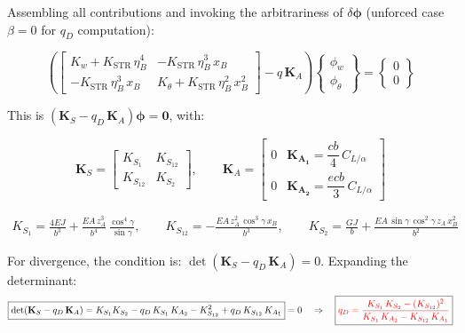Assembling all contributions and invoking the arbitrariness of $\delta\boldsymbol{\phi}$
(unforced case $\beta = 0$ for $q_D$ computation):

\begin{equation}
\boxed{
\left(
\begin{bmatrix}
K_w + K_{\mathrm{STR}}\,\eta_B^4 & -K_{\mathrm{STR}}\,\eta_B^3\,x_B \\
-K_{\mathrm{STR}}\,\eta_B^3\,x_B & K_\theta + K_{\mathrm{STR}}\,\eta_B^2\,x_B^2
\end{bmatrix}
- q\,\mathbf{K}_A
\right)
\begin{Bmatrix}\phi_w \\ \phi_\theta\end{Bmatrix}
=
\begin{Bmatrix}0\\0\end{Bmatrix}
}
\end{equation}

This is $\left(\mathbf{K}_S - q_D\,\mathbf{K}_A\right)\boldsymbol{\phi} = \mathbf{0}$, with:

\begin{equation}
\mathbf{K}_S =
\begin{bmatrix}
K_{S_1} & K_{S_{12}} \\
K_{S_{12}} & K_{S_2}
\end{bmatrix},
\qquad
\mathbf{K}_A =
\begin{bmatrix}
0 & \mathbf{K_{A_1}}=\dfrac{cb}{4}\,C_{L/\alpha} \\[6pt]
0 & \mathbf{K_{A_2}}=\dfrac{ecb}{3}\,C_{L/\alpha}
\end{bmatrix}
\end{equation}

\begin{align}
K_{S_1} = \frac{4EJ}{b^3} + \frac{EA\,z_A^3}{b^4}\,\frac{\cos^4\gamma}{\sin\gamma}, \qquad K_{S_{12}} = -\frac{EA\,z_A^2\,\cos^3\gamma\,x_B}{b^3}, \qquad K_{S_2} = \frac{GJ}{b} + \frac{EA\,\sin\gamma\,\cos^2\gamma\,z_A\,x_B^2}{b^2}
\end{align}

For divergence, the condition is: $\det\!\left(\mathbf{K}_S - q_D\,\mathbf{K}_A\right) = 0$. Expanding the determinant:
\begin{equation}
    \label{eq:det_KTOT}
\boxed{\det\!\left(\mathbf{K}_S - q_D\,\mathbf{K}_A\right) = K_{S_1}K_{S_2} - q_D\,K_{S_1}\,K_{A_2} - K_{S_{12}}^2 + q_D\,K_{S_{12}}\,K_{A_{1}}} = 0 \quad \Rightarrow \quad
\boxed{\textcolor{red!90!black}{q_D = \frac{K_{S_1}\,K_{S_2} - (K_{S_{12}})^2}{K_{S_1}\,K_{A_2} - K_{S_{12}}\,K_{A_{1}}}}}
\end{equation}
